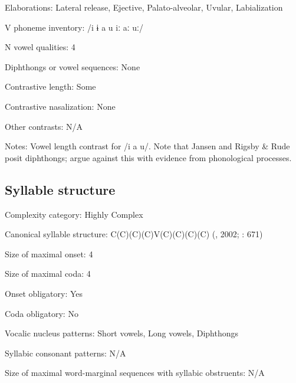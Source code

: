 {\begin{appendixdesc}
\item[Elaborations:] Lateral release, Ejective, Palato-alveolar, Uvular, Labialization

\item[V phoneme inventory:] /i ɨ a u iː aː uː/

\item[N vowel qualities:] 4

\item[Diphthongs or vowel sequences:] None

\item[Contrastive length:] Some

\item[Contrastive nasalization:] None

\item[Other contrasts:] N/A

\item[Notes:] Vowel length contrast for /i a u/. Note that Jansen and Rigsby \& Rude posit diphthongs; \citet{HargusBeavert2006} argue against this with evidence from phonological processes.
\end{appendixdesc}
\subsection*{Syllable structure}
\begin{appendixdesc}

\item[Complexity category:] Highly Complex

\item[Canonical syllable structure:] C(C)(C)(C)V(C)(C)(C)(C) (\citealt{HargusBeavert2006}, 2002; \citealt{RigsbyRude1996}: 671)

\item[Size of maximal onset:] 4

\item[Size of maximal coda:] 4

\item[Onset obligatory:] Yes

\item[Coda obligatory:] No

\item[Vocalic nucleus patterns:] Short vowels, Long vowels, Diphthongs

\item[Syllabic consonant patterns:] N/A

\item[Size of maximal word-marginal sequences with syllabic obstruents:] N/A


\end{appendixdesc}}
